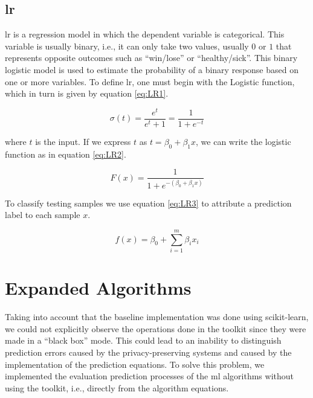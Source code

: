 \subsection{\acl{lr}}
\label{ssec:LogisticRegression}


\ac{lr} is a regression model in which the dependent variable is categorical. This variable is usually binary, i.e., it can only take two values, usually $0$ or $1$ that represents opposite outcomes such as ``win/lose'' or ``healthy/sick''.
This binary logistic model is used to estimate the probability of a binary response based on one or more variables.
To define \ac{lr}, one must begin with the Logistic function, which in turn is given by equation \ref{eq:LR1}.

\begin{equation}
\label{eq:LR1}
\sigma (t)={\frac {e^{t}}{e^{t}+1}}={\frac {1}{1+e^{-t}}}
\end{equation}

where $t$ is the input. If we express $t$ as $t=\beta _{0}+\beta _{1}x$, we can write the logistic function as in equation \ref{eq:LR2}.

\begin{equation}
\label{eq:LR2}
F(x)={\frac {1}{1+e^{-(\beta _{0}+\beta _{1}x)}}}
\end{equation}


To classify testing samples we use equation \ref{eq:LR3} to attribute a prediction label to each sample $x$.

\begin{equation}
\label{eq:LR3}
f(x)=\beta_0+\sum_{i=1}^m \beta_i x_i
\end{equation}

\section{Expanded Algorithms}
\label{sec:ExpandedAlgorithmsImplementation}


Taking into account that the baseline implementation was done using scikit-learn, we could not explicitly observe the operations done in the toolkit since they were made in a ``black box'' mode. This could lead to an inability to distinguish prediction errors caused by the privacy-preserving systems and caused by the implementation of the prediction equations. To solve this problem, we implemented the evaluation prediction processes of the \ac{ml} algorithms without using the toolkit, i.e., directly from the algorithm equations.


